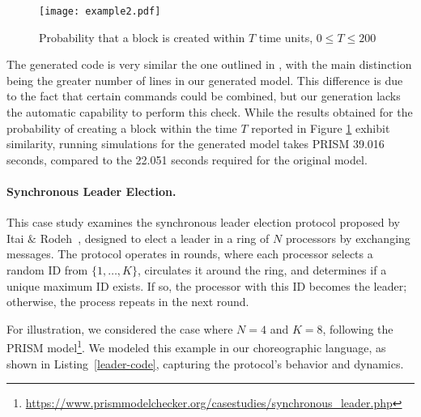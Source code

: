 \begin{figure}[h]
	\centering
	\texttt{[image: example2.pdf]}	
	\caption{Probability that a block is created within $T$ time units, $0\leq T\leq 200$}
	\label{ex5-res}
	\end{figure}
        The generated code is very similar the one outlined in
        \cite{DBLP:journals/distribledger/GallettaLMV23}, with the
        main distinction being the greater number of lines in our
        generated model.  This difference is due to the fact that
        certain commands could be combined, but our generation lacks
        the automatic capability to perform this check. While the
        results obtained for the probability of creating a block within the time $T$
        reported in Figure \ref{ex5-res} exhibit similarity, running
        simulations for the generated model takes PRISM 39.016
        seconds, compared to the 22.051 seconds required for the
        original model.



\paragraph{Synchronous Leader Election.}
This case study examines the synchronous leader election protocol proposed by Itai $\&$ Rodeh~\cite{IR90}, designed to elect a leader in a ring of $N$ processors by exchanging messages. The protocol operates in rounds, where each processor selects a random ID from $\{1, \ldots, K\}$, circulates it around the ring, and determines if a unique maximum ID exists. If so, the processor with this ID becomes the leader; otherwise, the process repeats in the next round.

For illustration, we considered the case where $ N=4 $ and $ K=8 $, following the PRISM model\footnote{\url{https://www.prismmodelchecker.org/casestudies/synchronous_leader.php}}. We modeled this example in our choreographic language, as shown in Listing~\ref{leader-code}, capturing the protocol's behavior and dynamics.


